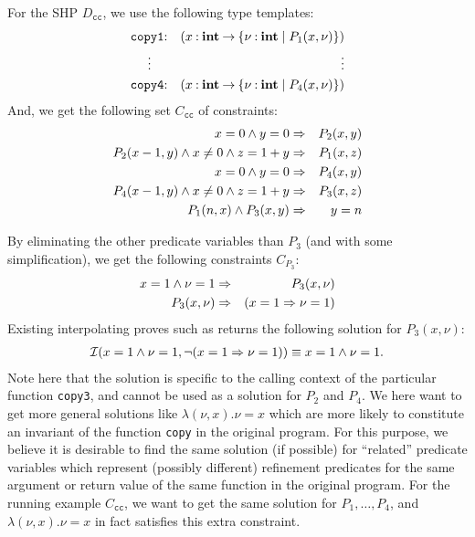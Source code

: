 For the SHP \(D_{\texttt{cc}}\), we use the following type templates:
\begin{eqnarray*}
\texttt{copy1}&\mathbin{:}&(x\mathbin{:}{\mathbf{int}}\mathbin{\rightarrow}{\{{\nu\mathbin{:}\mathbf{int} \mid P_1(x,\nu)}\}}) \\
\vdots\quad &&\qquad\qquad \vdots \\
\texttt{copy4}&\mathbin{:}&(x\mathbin{:}{\mathbf{int}}\mathbin{\rightarrow}{\{{\nu\mathbin{:}\mathbf{int} \mid P_4(x,\nu)}\}})
\end{eqnarray*}
And, we get the following set \(C_{\texttt{cc}}\) of constraints:
\begin{eqnarray*}
x=0 \land y=0 &\Rightarrow& P_2(x,y) \\
P_2(x-1,y) \land x\neq0 \land z=1+y &\Rightarrow& P_1(x,z) \\
x=0 \land y=0 &\Rightarrow& P_4(x,y) \\
P_4(x-1,y) \land x\neq0 \land z=1+y &\Rightarrow& P_3(x,z) \\
P_1(n,x) \land P_3(x,y) &\Rightarrow& y=n
\end{eqnarray*}

By eliminating the other predicate variables than \(P_3\) (and with some 
simplification), we get the following constraints \(C_{P_3}\):
\begin{eqnarray*}
x=1 \land \nu=1 &\Rightarrow& P_3(x,\nu) \\
P_3(x,\nu) &\Rightarrow& (x=1 \Rightarrow \nu=1)
\end{eqnarray*}
Existing interpolating proves such as \cite{Beyer2008} returns the 
following solution for \(P_3(x,\nu)\):
\begin{eqnarray*}
\mathcal{I}(x=1 \land \nu=1,\neg (x=1 \Rightarrow \nu=1))
\equiv x=1 \land \nu=1.
\end{eqnarray*}
Note here that the solution is specific to the calling context of the 
particular function \texttt{copy3}, and cannot be used as a solution for 
\(P_2\) and \(P_4\).  We here want to get more general solutions like 
\(\lambda (\nu,x).\nu=x\) which are more likely to constitute an 
invariant of the function \texttt{copy} in the original program.  For 
this purpose, we believe it is desirable to find the same solution (if 
possible) for ``related'' predicate variables which represent (possibly 
different) refinement predicates for the same argument or return value 
of the same function in the original program.  For the running example 
\(C_{\texttt{cc}}\), we want to get the same solution for 
\(P_1,\dots,P_4\), and \(\lambda (\nu,x).\nu=x\) in fact satisfies this 
extra constraint.

